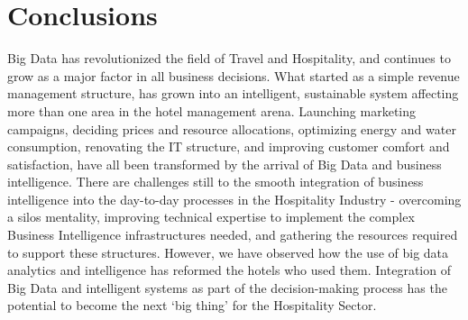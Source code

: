 \documentclass[sigconf]{acmart}
\begin{document}
\section{Conclusions}
Big Data has revolutionized the field of Travel and Hospitality, and continues to grow as a major factor in all business decisions. What started as a simple revenue management structure, has grown into an intelligent, sustainable system affecting more than one area in the hotel management arena. Launching marketing campaigns, deciding prices and resource allocations, optimizing energy and water consumption, renovating the IT structure, and improving customer comfort and satisfaction, have all been transformed by the arrival of Big Data and business intelligence. There are challenges still to the smooth integration of business intelligence into the day-to-day processes in the Hospitality Industry - overcoming a silos mentality, improving technical expertise to implement the complex Business Intelligence infrastructures needed, and gathering the resources required to support these structures. However, we have observed how the use of big data analytics and intelligence has reformed the hotels who used them. Integration of Big Data and intelligent systems as part of the decision-making process has the potential to become the next `big thing' for the Hospitality Sector.


 
\end{document}
